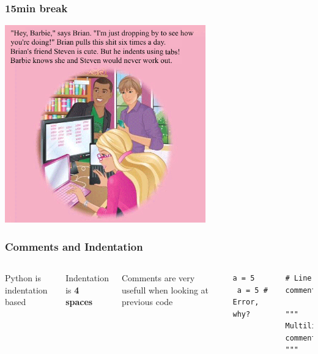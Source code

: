 \begin{frame} 
    \frametitle{15min break}
    \begin{center}
        \includegraphics[width=0.65\textwidth]{images/barbie1.png}
    \end{center}
\end{frame}

\begin{frame}[fragile]

    \frametitle{Comments and Indentation}

    \begin{columns}[t]


            Python is indentation based

            Indentation is {\bf 4 spaces}

            \bigskip
            \bigskip

            Comments are very usefull when looking at previous code



\begin{lstlisting}
a = 5
 a = 5 # Error, why?

\end{lstlisting}

\begin{lstlisting}
# Line comment

"""
Multiline
comment
"""
\end{lstlisting}

    \end{columns}

\end{frame}




